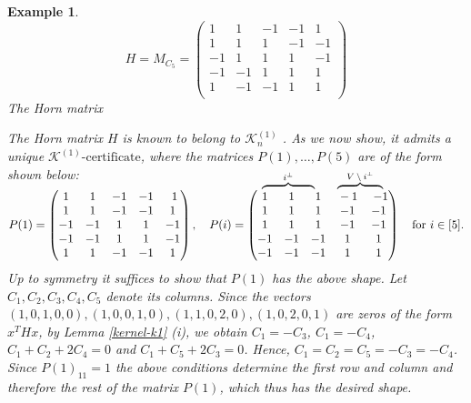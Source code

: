 \documentclass[11pt]{article}
\newcommand\bovermat[2]{%
  \makebox[0pt][l]{$\smash{\overbrace{\phantom{%
    \begin{matrix}#2\end{matrix}}}^{\text{#1}}}$}#2}
\newtheorem{example}[theorem]{Example}
\newcommand{\konec}{\MK^{(1)}\text{-certificate}}
\numberwithin{equation}{section}
\newcommand{\MK}{{\mathcal K}}
\begin{document}
\begin{example}
\begin{minipage}[t]{0.4\linewidth}
$$H= M_{C_5}=
\begin{pmatrix}
1 & 1 & -1 & -1 & 1 \\
1 & 1 & 1 & -1 & -1  \\
-1 & 1 & 1 & 1 & -1  \\
-1 & -1 & 1 & 1 & 1  \\
1 & -1 & -1 & 1 & 1  \\
\end{pmatrix}$$
 \hspace{2cm}The Horn matrix
\end{minipage}


 The Horn matrix $H$ is known to belong to $\MK_n^{(1)}$ \cite{Parrilo-thesis-2000}.  As we now show, it admits a unique $\konec$, where the matrices  $P(1),\ldots,P(5)$ are of the form shown below:
\begin{equation}\label{eqPiC5}
P(1)=
\begin{pmatrix}
1 & 1 & -1 & -1 & 1 \\
1 & 1 & -1 & -1 & 1  \\
-1 & -1 & 1 & 1 & -1  \\
-1 & -1 & 1 & 1 & -1  \\
1 & 1 & -1 & -1 & 1  \\
\end{pmatrix}, \quad P(i)=
\begin{pmatrix}
\bovermat{$i^{\perp}$}{1 & 1 & 1 &} \bovermat{$V\setminus i^{\perp}$}{-1 & -1} \\
1 & 1 & 1 & -1 & -1  \\
1 & 1 & 1 & -1 & -1  \\
-1 & -1 & -1 & 1 & 1  \\
-1 & -1 & -1 & 1 & 1  \\
\end{pmatrix} \ \ \text{ for } i\in [5].
\end{equation}
Up to symmetry it suffices to show that $P(1)$ %
has the above  shape. Let $C_1, C_2, C_3, C_4, C_5$ denote its  columns. Since the vectors $(1,0,1,0,0), (1,0,0,1,0), (1,1,0,2,0), (1,0,2,0,1)$ are zeros of the form  $x^THx$, by Lemma \ref{kernel-k1} (i), we obtain $C_1=-C_3$, $C_1=-C_4$, $C_1+C_2+2C_4=0$ and $C_1+C_5+2C_3=0$. Hence, $C_1=C_2=C_5=-C_3=-C_4$.  Since $P(1)_{11}=1$ the above conditions determine the first row and column and therefore the rest of the matrix $P(1)$, which thus has the desired shape. %
\end{example}
\end{document}
